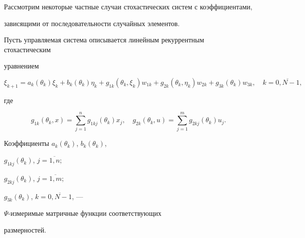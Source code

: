 Рассмотрим некоторые частные случаи стохастических систем с коэффициентами,


зависящими от последовательности случайных элементов.





Пусть управляемая система описывается линейным рекуррентным стохастическим


уравнением


\begin{equation}


\xi_{k+1}=a_{k}(\theta_{k})\xi_{k}+b_{k}(\theta_{k})\eta_{k}+


g_{1k}(\theta_{k},\xi_{k})w_{1k}+


g_{2k}(\theta_{k},\eta_{k})w_{2k}+ g_{3k}(\theta_{k})w_{3k},\quad


k=\overline{0,N-1},


\end{equation}


где


$$


g_{1k}(\theta_{k},x)=\sum_{j=1}^{n}g_{1kj}(\theta_{k})x_{j},\quad


g_{2k}(\theta_{k},u)=\sum_{j=1}^{m}g_{2kj}(\theta_{k})u_{j}.


$$


Коэффициенты $a_{k}(\theta_{k})$, $b_{k}(\theta_{k})$,


$g_{1kj}(\theta_{k})$, $j=\overline{1,n}$;


$g_{2kj}(\theta_{k})$, $j=\overline{1,m}$;


$g_{3k}(\theta_{k})$, $k=\overline{0,N-1}$, --- \linebreak


$\Psi$-измеримые матричные функции соответствующих


размерностей.





